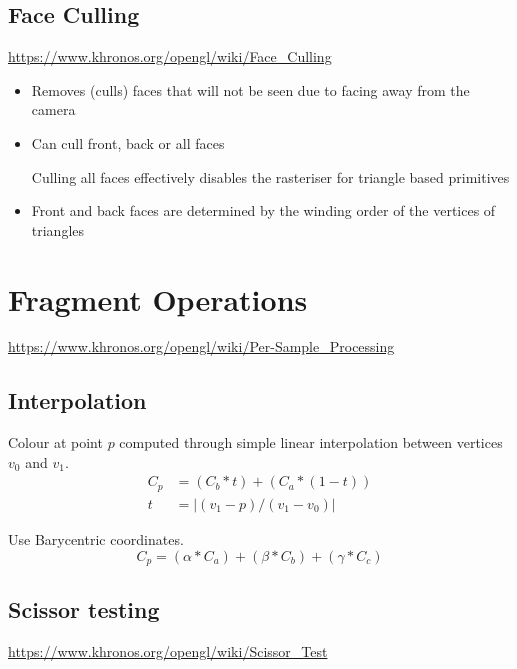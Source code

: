 \documentclass[a4paper]{article}
\begin{document}
\subsection{Face Culling}

\url{https://www.khronos.org/opengl/wiki/Face_Culling}

\begin{itemize}
  \item
    Removes (culls) faces that will not be seen due to facing away from the
    camera

  \item
    Can cull front, back or all faces

    Culling all faces effectively disables the rasteriser for triangle based
    primitives

  \item
    Front and back faces are determined by the winding order of the vertices of
    triangles

\end{itemize}

\section{Fragment Operations}
\label{sec:fragment_operations}

\url{https://www.khronos.org/opengl/wiki/Per-Sample_Processing}

\subsection{Interpolation}


Colour at point $p$ computed through simple linear interpolation between
vertices $v_{0}$ and $v_{1}$.
\begin{align*}
  C_{p} &= (C_{b} * t) + (C_{a} * (1 - t)) \\
  t &= |(v_{1} - p) / (v_{1} - v_{0})|
\end{align*}


Use Barycentric coordinates.
\[
  C_{p} = (\alpha * C_{a}) + (\beta * C_{b}) + (\gamma * C_{c})
\]

\subsection{Scissor testing}

\url{https://www.khronos.org/opengl/wiki/Scissor_Test}
\end{document}
